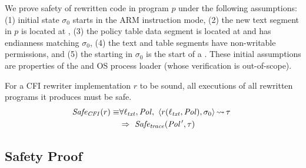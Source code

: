 We prove safety of rewritten code in program $p$ under the following assumptions:
(1) initial state $\sigma_0$ starts in the ARM instruction mode,
(2) the new text segment in $p$ is located at \bip,
(3) the policy table data segment is located at \tbi and has endianness matching $\sigma_0$,
(4) the text and table segments have non-writable permissions,
and
(5) the starting \PC in $\sigma_0$ is the start of a \Block.
These initial assumptions are properties of the \ELFPackager and OS process loader (whose verification is out-of-scope).



For a CFI rewriter implementation $r$ to be sound, all executions of all rewritten programs it produces must be safe.
\begin{equation}
  \begin{aligned}
    \mathit{Safe_{CFI}}(r) \equiv & \forall \ell_\mathit{txt}, \mathit{Pol},\ \langle r(\ell_\mathit{txt},\mathit{Pol}),\sigma_0\rangle\,{\leadsto}\,\tau\ \\
    & \Rightarrow\ \mathit{Safe_{trace}}(\mathit{Pol}\kern1pt',\tau)
  \end{aligned}
\end{equation}

\subsection{Safety Proof}

